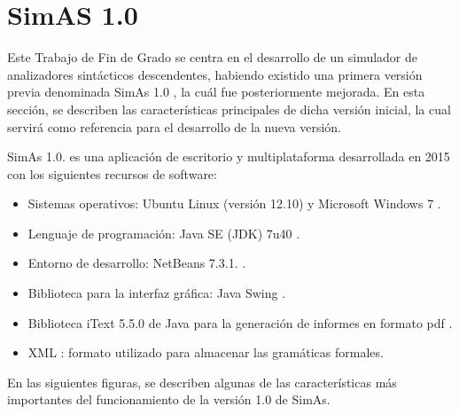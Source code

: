 \newpage 

\section{SimAS 1.0}\label{sec:SimAs1.0}

Este Trabajo de Fin de Grado se centra en el desarrollo de un simulador de analizadores sintácticos descendentes, habiendo existido una primera versión previa denominada SimAs 1.0 \cite{vanesa}, la cuál fue posteriormente mejorada. En esta sección, se describen las características principales de dicha versión inicial, la cual servirá como referencia para el desarrollo de la nueva versión.

SimAs 1.0. es una aplicación de escritorio y multiplataforma desarrollada en 2015 con los siguientes recursos de software:
 \begin{itemize}
     \item Sistemas operativos: Ubuntu Linux (versión 12.10) \cite{ubuntu} y Microsoft Windows 7 \cite{windows}.
     \item Lenguaje de programación: Java SE (JDK) 7u40 \cite{java}.
     \item Entorno de desarrollo: NetBeans 7.3.1. \cite{netbeans}.
     \item Biblioteca para la interfaz gráfica: Java Swing \cite{javaswing}.
     \item Biblioteca iText 5.5.0 de Java para la generación de informes en formato pdf \cite{itextpdf}.
     \item XML \cite{xml}: formato utilizado para almacenar las gramáticas formales.
 \end{itemize}

En las siguientes figuras, se describen algunas de las características más importantes del funcionamiento de la versión 1.0 de SimAs. 

